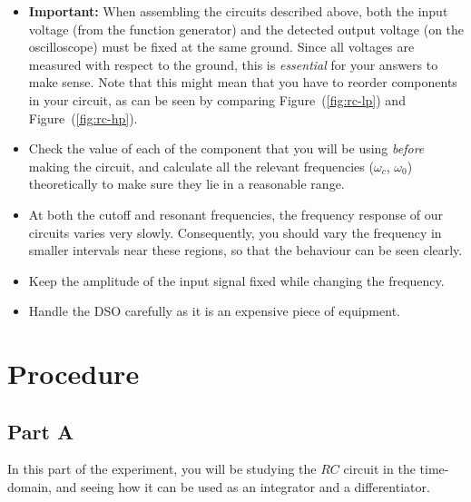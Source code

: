 \begin{itemize}
\item \textbf{Important:} When assembling the circuits described above, both the input voltage (from the function generator) and the detected output voltage (on the oscilloscope) must be fixed at the same ground. Since all voltages are measured with respect to the ground, this is \textsl{essential} for your answers to make sense. Note that this might mean that you have to reorder components in your circuit, as can be seen by comparing Figure~(\ref{fig:rc-lp}) and Figure~(\ref{fig:rc-hp}).

\item Check the value of each of the component that you will be using \textsl{before} making the circuit, and calculate all the relevant frequencies ($\omega_c$, $\omega_0$) theoretically to make sure they lie in a reasonable range.
\item At both the cutoff and resonant frequencies, the frequency response of our circuits varies very slowly. Consequently, you should vary the frequency in smaller intervals near these regions, so that the behaviour can be seen clearly.
\item Keep the amplitude of the input signal fixed while changing the frequency.
\item Handle the DSO carefully as it is an expensive piece of equipment.
\end{itemize}


\section*{Procedure}

\subsection*{Part A}

In this part of the experiment, you will be studying the $RC$ circuit in the time-domain, and seeing how it can be used as an integrator and a differentiator. 

